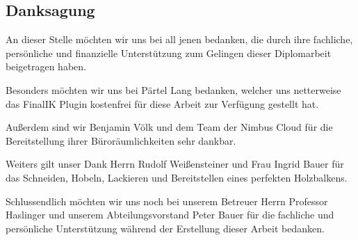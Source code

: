 \begin{spacing}{1}

    \chapter*{Danksagung}

\end{spacing}

An dieser Stelle möchten wir uns bei all jenen bedanken, die durch ihre fachliche, persönliche und finanzielle Unterstützung zum Gelingen dieser Diplomarbeit beigetragen haben.

Besonders möchten wir uns bei Pärtel Lang bedanken, welcher uns netterweise das FinalIK Plugin kostenfrei für diese Arbeit zur Verfügung gestellt hat.

Außerdem sind wir Benjamin Völk und dem Team der Nimbus Cloud für die Bereitstellung ihrer Büroräumlichkeiten sehr dankbar.

Weiters gilt unser Dank Herrn Rudolf Weißensteiner und Frau Ingrid Bauer für das Schneiden, Hobeln, Lackieren und Bereitstellen eines perfekten Holzbalkens.

Schlussendlich möchten wir uns noch bei unserem Betreuer Herrn Professor Haslinger und unserem Abteilungsvorstand Peter Bauer für die fachliche und persönliche Unterstützung während der Erstellung dieser Arbeit bedanken.
